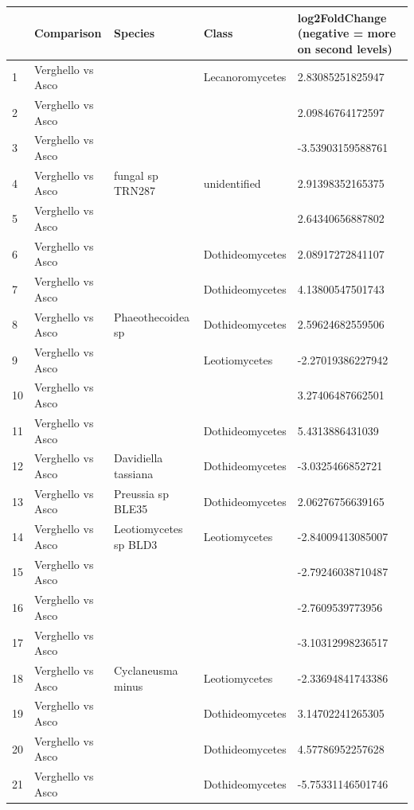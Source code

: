 \documentclass[12pt]{article}\usepackage[]{graphicx}\usepackage[]{color}
\numberwithin{figure}{section}
\begin{document}
\begin{table}[ht]
\centering
\begingroup\tiny
\begin{tabular}{lllll}
  \hline
 & Comparison & Species & Class & log2FoldChange 
 (negative = more on second levels) \\ 
  \hline
1 & Verghello vs Asco &  & Lecanoromycetes & 2.83085251825947 \\ 
  2 & Verghello vs Asco &  &  & 2.09846764172597 \\ 
  3 & Verghello vs Asco &  &  & -3.53903159588761 \\ 
  4 & Verghello vs Asco & fungal sp TRN287 & unidentified & 2.91398352165375 \\ 
  5 & Verghello vs Asco &  &  & 2.64340656887802 \\ 
  6 & Verghello vs Asco &  & Dothideomycetes & 2.08917272841107 \\ 
  7 & Verghello vs Asco &  & Dothideomycetes & 4.13800547501743 \\ 
  8 & Verghello vs Asco & Phaeothecoidea sp & Dothideomycetes & 2.59624682559506 \\ 
  9 & Verghello vs Asco &  & Leotiomycetes & -2.27019386227942 \\ 
  10 & Verghello vs Asco &  &  & 3.27406487662501 \\ 
  11 & Verghello vs Asco &  & Dothideomycetes & 5.4313886431039 \\ 
  12 & Verghello vs Asco & Davidiella tassiana & Dothideomycetes & -3.0325466852721 \\ 
  13 & Verghello vs Asco & Preussia sp BLE35 & Dothideomycetes & 2.06276756639165 \\ 
  14 & Verghello vs Asco & Leotiomycetes sp BLD3 & Leotiomycetes & -2.84009413085007 \\ 
  15 & Verghello vs Asco &  &  & -2.79246038710487 \\ 
  16 & Verghello vs Asco &  &  & -2.7609539773956 \\ 
  17 & Verghello vs Asco &  &  & -3.10312998236517 \\ 
  18 & Verghello vs Asco & Cyclaneusma minus & Leotiomycetes & -2.33694841743386 \\ 
  19 & Verghello vs Asco &  & Dothideomycetes & 3.14702241265305 \\ 
  20 & Verghello vs Asco &  & Dothideomycetes & 4.57786952257628 \\ 
  21 & Verghello vs Asco &  & Dothideomycetes & -5.75331146501746 \\ 

\end{tabular}
\end{table}
\end{document}
